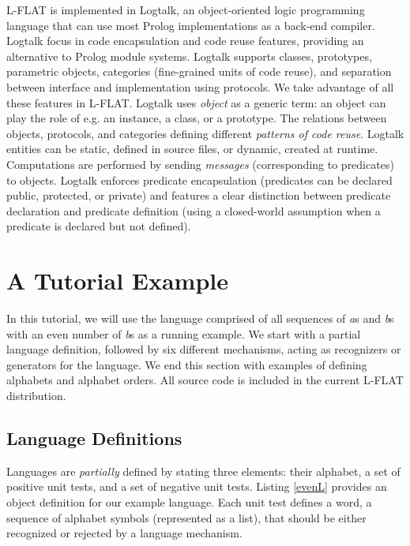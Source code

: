 \documentclass{llncs}
\begin{document}
L-FLAT is implemented in Logtalk, an object-oriented logic programming language that can use most Prolog implementations as a back-end compiler. Logtalk focus in code encapsulation and code reuse features, providing an alternative to Prolog module systems. Logtalk supports classes, prototypes, parametric objects, categories (fine-grained units of code reuse), and separation between interface and implementation using protocols. We take advantage of all these features in L-FLAT. Logtalk uses \textsl{object} as a generic term: an object can play the role of e.g. an instance, a class, or a prototype. The relations between objects, protocols, and categories defining different \textsl{patterns of code reuse}. Logtalk entities can be static, defined in source files, or dynamic, created at runtime. Computations are performed by sending \textsl{messages} (corresponding to predicates) to objects. Logtalk enforces predicate encapsulation (predicates can be declared public, protected, or private) and features a clear distinction between predicate declaration and predicate definition (using a closed-world assumption when a predicate is declared but not defined). 




\section{A Tutorial Example}

In this tutorial, we will use the language comprised of all sequences of \textsl{a}s and \textsl{b}s with an even number of \textsl{b}s as a running example. We start with a partial language definition, followed by six different mechanisms, acting as recognizers or generators for the language. We end this section with examples of defining alphabets and alphabet orders. All source code is included in the current L-FLAT distribution.


\subsection{Language Definitions}

Languages are \textsl{partially} defined by stating three elements: their alphabet, a set of positive unit tests, and a set of negative unit tests. Listing \ref{evenL} provides an object definition for our example language.  Each unit test defines a word, a sequence of alphabet symbols (represented as a list), that should be either recognized or rejected by a language mechanism.
\end{document}
